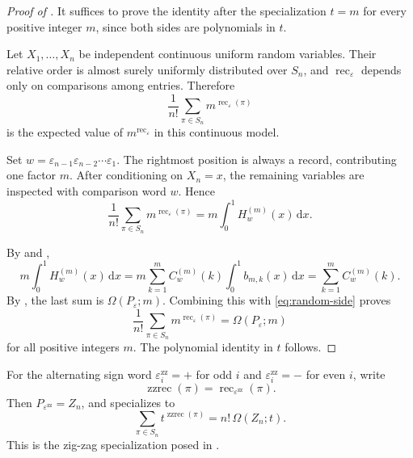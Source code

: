 \documentclass[11pt,letterpaper,reqno]{amsart}
\theoremstyle{definition}
\DeclareMathOperator{\rec}{rec}
\DeclareMathOperator{\zzrec}{zzrec}
\newcommand{\dd}{\,\mathrm{d}}
\newcommand{\eps}{\varepsilon}
\begin{document}
\begin{proof}[Proof of ]
It suffices to prove the identity after the specialization \(t=m\) for every
positive integer \(m\), since both sides are polynomials in \(t\).

Let \(X_1,\ldots,X_n\) be independent continuous uniform random variables.
Their relative order is almost surely uniformly distributed over \(S_n\), and
\(\rec_\eps\) depends only on comparisons among entries.  Therefore
\[
\frac1{n!}\sum_{\pi\in S_n}m^{\rec_\eps(\pi)}
\]
is the expected value of \(m^{\rec_\eps}\) in this continuous model.

Set $w=\eps_{n-1}\eps_{n-2}\cdots\eps_1$. The rightmost position is always a record, contributing one factor \(m\).  After
conditioning on \(X_n=x\), the remaining variables are inspected with comparison
word \(w\).  Hence
\begin{equation}\label{eq:random-side}
\frac1{n!}\sum_{\pi\in S_n}m^{\rec_\eps(\pi)}
=m\int_0^1 H_w^{(m)}(x)\dd x.
\end{equation}

By  and ,
\[
m\int_0^1 H_w^{(m)}(x)\dd x
=
m\sum_{k=1}^m C_w^{(m)}(k)\int_0^1b_{m,k}(x)\dd x
=
\sum_{k=1}^m C_w^{(m)}(k).
\]
By , the last sum is \(\Omega(P_\eps;m)\).  Combining
this with \eqref{eq:random-side} proves
\[
\frac1{n!}\sum_{\pi\in S_n}m^{\rec_\eps(\pi)}=\Omega(P_\eps;m)
\]
for all positive integers \(m\).  The polynomial identity in \(t\) follows.
\end{proof}

For the alternating sign word
\(\eps_i^{\mathrm{zz}}=+\) for odd \(i\) and
\(\eps_i^{\mathrm{zz}}=-\) for even \(i\), write
\[
\zzrec(\pi)=\rec_{\eps^{\mathrm{zz}}}(\pi).
\]
Then \(P_{\eps^{\mathrm{zz}}}=Z_n\), and  specializes
to
\[
\sum_{\pi\in S_n}t^{\zzrec(\pi)}=n!\,\Omega(Z_n;t).
\]
This is the zig-zag specialization posed in \cite[Problem~5.3]{FMP}.
\end{document}
